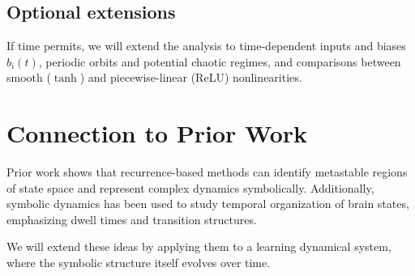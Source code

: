 \documentclass{article}
\begin{document}
\subsection*{Optional extensions}
If time permits, we will extend the analysis to time-dependent inputs and biases $b_i(t)$, periodic orbits and potential chaotic regimes, and comparisons between smooth ($\tanh$) and piecewise-linear (ReLU) nonlinearities.

\section*{Connection to Prior Work}
Prior work shows that recurrence-based methods can identify metastable regions of state space and represent complex dynamics symbolically. Additionally, symbolic dynamics has been used to study temporal organization of brain states, emphasizing dwell times and transition structures.

We will extend these ideas by applying them to a learning dynamical system, where the symbolic structure itself evolves over time.
\end{document}
